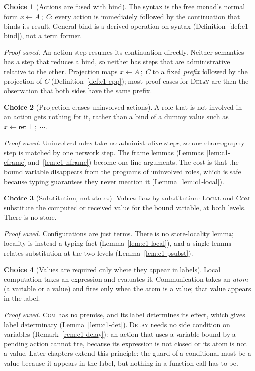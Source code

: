 \documentclass[11pt]{report}
\theoremstyle{plain}
\theoremstyle{definition}
\newtheorem{choice}{Choice}[chapter]
\theoremstyle{remark}
\newcommand{\kw}[1]{\mathsf{#1}}
\newcommand{\bind}[3]{#1 \leftarrow #2\,;\;#3}
\newcommand{\rn}[1]{{\normalfont\scshape #1}}
\begin{document}
\begin{choice}[Actions are fused with bind]\label{cho:c1-fused}
  The syntax is the free monad's normal form $\bind{x}{A}{C}$: every action is
  immediately followed by the continuation that binds its result.  General
  bind is a derived operation on syntax (Definition~\ref{def:c1-bind}), not a
  term former.

  \emph{Proof saved.}  An action step resumes its continuation directly.
  Neither semantics has a step that reduces a bind, so neither has steps that
  are administrative relative to the other.  Projection maps
  $\bind{x}{A}{C}$ to a fixed \emph{prefix} followed by the projection of $C$
  (Definition~\ref{def:c1-epp}); most proof cases for \rn{Delay} are then the
  observation that both sides have the same prefix.
\end{choice}

\begin{choice}[Projection erases uninvolved actions]\label{cho:c1-erase}
  A role that is not involved in an action gets nothing for it, rather than a
  bind of a dummy value such as $\bind{x}{\kw{ret}\;\bot}{\cdots}$.

  \emph{Proof saved.}  Uninvolved roles take no administrative steps, so one
  choreography step is matched by one network step.  The frame lemmas (Lemmas~\ref{lem:c1-cframe}
  and~\ref{lem:c1-nframe}) become one-line arguments.  The cost is that the
  bound variable disappears from the programs of uninvolved roles, which is
  safe because typing guarantees they never mention it
  (Lemma~\ref{lem:c1-local}).
\end{choice}

\begin{choice}[Substitution, not stores]\label{cho:c1-subst}
  Values flow by substitution: \rn{Local} and \rn{Com} substitute the
  computed or received value for the bound variable, at both levels.  There
  is no store.

  \emph{Proof saved.}  Configurations are just terms.  There is no
  store-locality lemma; locality is instead a typing fact
  (Lemma~\ref{lem:c1-local}), and a single lemma relates substitution at the
  two levels (Lemma~\ref{lem:c1-psubst}).
\end{choice}

\begin{choice}[Values are required only where they appear in labels]\label{cho:c1-values}
  Local computation takes an expression and evaluates it.  Communication
  takes an \emph{atom} (a variable or a value) and fires only when the atom
  is a value; that value appears in the label.

  \emph{Proof saved.}  \rn{Com} has no premise, and its label determines its
  effect, which gives label determinacy (Lemma~\ref{lem:c1-det}).  \rn{Delay}
  needs no side condition on variables (Remark~\ref{rem:c1-delay}): an action
  that uses a variable bound by a pending action cannot fire, because its
  expression is not closed or its atom is not a value.  Later chapters
  extend this principle: the guard of a conditional must be a value because
  it appears in the label, but nothing in a function call has to be.
\end{choice}
\end{document}
